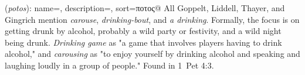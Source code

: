 \item[Carouse,]

(\textit{potos}):
{
    name=,
    description={},
    sort=ποτος@
}
All Goppelt, Liddell, Thayer, and Gingrich mention \emph{carouse}, \emph{drinking-bout}, and \emph{a drinking}. Formally, the focus is on getting drunk by alcohol, probably a wild party or festivity, and a wild night being drunk. \emph{Drinking game} as "a game that involves players having to drink alcohol," and \emph{carousing} as "to enjoy yourself by drinking alcohol and speaking and laughing loudly in a group of people."
Found in 1~Pet 4:3.

